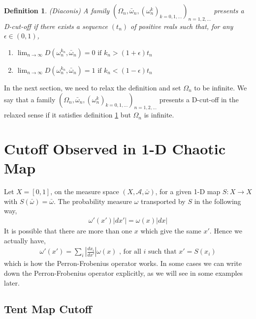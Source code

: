 \documentclass{article}
\newtheorem{definition}{Definition}
\begin{document}
\begin{definition}
\label{cutoffdefinition}
(Diaconis) A family $(\Omega_n,\bar{\omega}_n, (\omega^k_n)_{k=0,1,...})_{n=1,2,...}$
presents a D-cut-off if there exists a sequence $(t_n)$ of positive
reals such that, for any $\epsilon \in(0,1)$,
\begin{enumerate}
  \item $\lim_{n \rightarrow \infty}D(\omega^{k_n}_n,\bar{\omega}_n) = 0 \mbox{ if }
  k_n>(1+\epsilon)t_n$
  \item $\lim_{n \rightarrow \infty}D(\omega^{k_n}_n,\bar{\omega}_n) = 1 \mbox{ if }
  k_n<(1-\epsilon)t_n $
\end{enumerate}
\end{definition}

In the next section, we need to relax the definition and set $\Omega_n$ to be infinite. We say that a family $(\Omega_n,\bar{\omega}_n, (\omega^k_n)_{k=0,1,...})_{n=1,2,...}$ presents a D-cut-off in the relaxed sense if it satisfies definition \ref{cutoffdefinition} but $\Omega_n$ is infinite. 


\section{Cutoff Observed in 1-D Chaotic Map}


Let $X = [0,1]$, on the measure space  $(X,\mathcal{A},\bar{\omega})$, for a given 1-D map $S: X \rightarrow X $ with $S(\bar{\omega})=\bar{\omega}$. The probability measure $\omega$  transported by $S$ in the following way, 
  \begin{eqnarray}
    \omega'(x')|dx'| = \omega(x)|dx|
  \end{eqnarray}
It is possible that there are more than one $x$ which give the same $x'$. Hence we actually have,
  \begin{eqnarray}
  \label{omegamap}
    \omega'(x') = \sum_i \left|\frac{dx_i}{dx'}\right|\omega(x) \mbox{   , for all } i \mbox{  such that  } x'=S(x_i)
  \end{eqnarray}
which is how the Perron-Frobenius operator works. In some cases we can write down the Perron-Frobenius operator explicitly, as we will see in some examples later. 


\subsection{Tent Map Cutoff}
\end{document}
